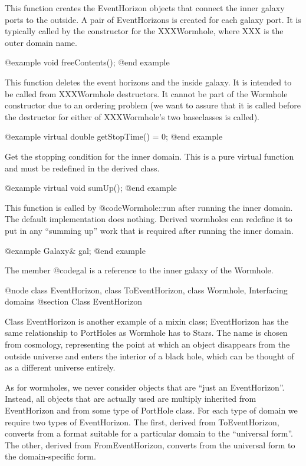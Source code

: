 This function creates the EventHorizon objects that connect the inner
galaxy ports to the outside.  A pair of EventHorizons is created for
each galaxy port.  It is typically called by the constructor for
the XXXWormhole, where XXX is the outer domain name.

@example
void freeContents();
@end example

This function deletes the event horizons and the inside galaxy.  It
is intended to be called from XXXWormhole destructors.  It cannot be
part of the Wormhole constructor due to an ordering problem (we want
to assure that it is called before the destructor for either of
XXXWormhole's two baseclasses is called).

@example
virtual double getStopTime() = 0;
@end example

Get the stopping condition for the inner domain.  This is a pure
virtual function and must be redefined in the derived class.

@example
virtual void sumUp();
@end example

This function is called by @code{Wormhole::run} after running the
inner domain.  The default implementation does nothing.  Derived
wormholes can redefine it to put in any ``summing up'' work that is
required after running the inner domain.

@example
Galaxy& gal;
@end example

The member @code{gal} is a reference to the inner galaxy of the Wormhole.

@node class EventHorizon, class ToEventHorizon, class Wormhole, Interfacing domains
@section Class EventHorizon

Class EventHorizon is another example of a mixin class; EventHorizon has
the same relationship to PortHoles as Wormhole has to Stars.  The name
is chosen from cosmology, representing the point at which an object
disappears from the outside universe and enters the interior of a black
hole, which can be thought of as a different universe entirely.

As for wormholes, we never consider objects that are ``just an
EventHorizon''.  Instead, all objects that are actually used are multiply
inherited from EventHorizon and from some type of PortHole class.  For
each type of domain we require two types of EventHorizon.  The first, derived
from ToEventHorizon, converts from a format suitable for a particular
domain to the ``universal form''.  The other, derived from FromEventHorizon,
converts from the universal form to the domain-specific form.

